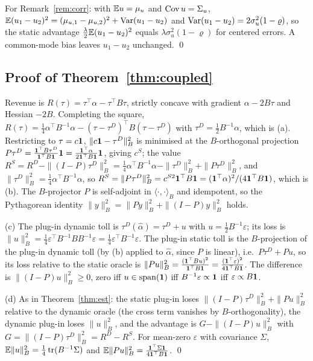 For Remark~\ref{rem:corr}: with $\mathbb{E} u=\mu_u$ and $\operatorname{Cov} u=\Sigma_u$, $\mathbb{E}(u_1-u_2)^2=(\mu_{u,1}-\mu_{u,2})^2+\operatorname{Var}(u_1-u_2)$ and $\operatorname{Var}(u_1-u_2)=2\sigma_u^2(1-\varrho)$, so the static advantage $\frac\lambda2\mathbb{E}(u_1-u_2)^2$ equals $\lambda\sigma_u^2(1-\varrho)$ for centered errors. A common-mode bias leaves $u_1-u_2$ unchanged. \qed

\subsection{Proof of Theorem~\ref{thm:coupled}}
Revenue is $R(\tau)=\tau^\top\alpha-\tau^\top B\tau$, strictly concave with gradient $\alpha-2B\tau$ and Hessian $-2B$. Completing the square, $R(\tau)=\frac14\alpha^\top B^{-1}\alpha-(\tau-\tau^D)^\top B(\tau-\tau^D)$ with $\tau^D=\frac12B^{-1}\alpha$, which is (a). Restricting to $\tau=c\mathbf{1}$, $\|c\mathbf{1}-\tau^D\|_B^2$ is minimised at the $B$-orthogonal projection $P\tau^D=\frac{\mathbf{1}^\top B\tau^D}{\mathbf{1}^\top B\mathbf{1}}\mathbf{1}=\frac{\mathbf{1}^\top\alpha}{2\mathbf{1}^\top B\mathbf{1}}\mathbf{1}$, giving $c^S$; the value $R^S=R^D-\|(I-P)\tau^D\|_B^2=\frac14\alpha^\top B^{-1}\alpha-\|\tau^D\|_B^2+\|P\tau^D\|_B^2$, and $\|\tau^D\|_B^2=\frac14\alpha^\top B^{-1}\alpha$, so $R^S=\|P\tau^D\|_B^2=c^{S2}\mathbf{1}^\top B\mathbf{1}=(\mathbf{1}^\top\alpha)^2/(4\mathbf{1}^\top B\mathbf{1})$, which is (b). The $B$-projector $P$ is self-adjoint in $\langle\cdot,\cdot\rangle_B$ and idempotent, so the Pythagorean identity $\|y\|_B^2=\|Py\|_B^2+\|(I-P)y\|_B^2$ holds.

(c) The plug-in dynamic toll is $\tau^D(\hat\alpha)=\tau^D+u$ with $u=\frac12B^{-1}\varepsilon$; its loss is $\|u\|_B^2=\frac14\varepsilon^\top B^{-1}BB^{-1}\varepsilon=\frac14\varepsilon^\top B^{-1}\varepsilon$. The plug-in static toll is the $B$-projection of the plug-in dynamic toll (by (b) applied to $\hat\alpha$, since $P$ is linear), i.e.\ $P\tau^D+Pu$, so its loss relative to the static oracle is $\|Pu\|_B^2=\frac{(\mathbf{1}^\top Bu)^2}{\mathbf{1}^\top B\mathbf{1}}=\frac{(\mathbf{1}^\top\varepsilon)^2}{4\mathbf{1}^\top B\mathbf{1}}$. The difference is $\|(I-P)u\|_B^2\ge0$, zero iff $u\in\mathrm{span}(\mathbf{1})$ iff $B^{-1}\varepsilon\propto\mathbf{1}$ iff $\varepsilon\propto B\mathbf{1}$.

(d) As in Theorem~\ref{thm:est}: the static plug-in loses $\|(I-P)\tau^D\|_B^2+\|Pu\|_B^2$ relative to the dynamic oracle (the cross term vanishes by $B$-orthogonality), the dynamic plug-in loses $\|u\|_B^2$, and the advantage is $G-\|(I-P)u\|_B^2$ with $G=\|(I-P)\tau^D\|_B^2=R^D-R^S$. For mean-zero $\varepsilon$ with covariance $\Sigma$, $\mathbb{E}\|u\|_B^2=\frac14\operatorname{tr}(B^{-1}\Sigma)$ and $\mathbb{E}\|Pu\|_B^2=\frac{\mathbf{1}^\top\Sigma\mathbf{1}}{4\mathbf{1}^\top B\mathbf{1}}$. \qed


